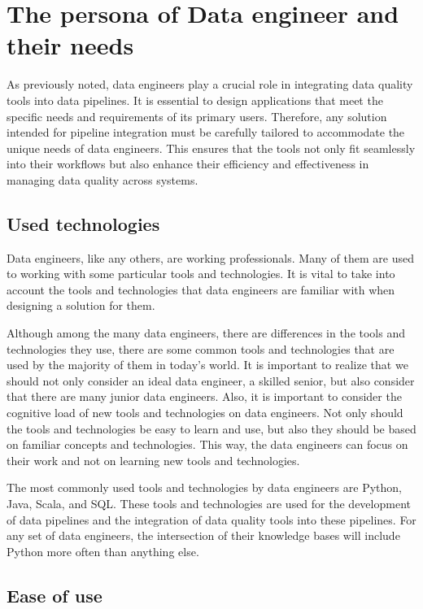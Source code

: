 \section{The persona of Data engineer and their needs}

As previously noted, data engineers play a crucial role in integrating data quality tools into data pipelines. It is essential to design applications that meet the specific needs and requirements of its primary users. Therefore, any solution intended for pipeline integration must be carefully tailored to accommodate the unique needs of data engineers. This ensures that the tools not only fit seamlessly into their workflows but also enhance their efficiency and effectiveness in managing data quality across systems.

\subsection{Used technologies}

Data engineers, like any others, are working professionals. Many of them are used to working with some particular tools and technologies. It is vital to take into account the tools and technologies that data engineers are familiar with when designing a solution for them.

Although among the many data engineers, there are differences in the tools and technologies they use, there are some common tools and technologies that are used by the majority of them in today's world. It is important to realize that we should not only consider an ideal data engineer, a skilled senior, but also consider that there are many junior data engineers. Also, it is important to consider the cognitive load of new tools and technologies on data engineers. Not only should the tools and technologies be easy to learn and use, but also they should be based on familiar concepts and technologies. This way, the data engineers can focus on their work and not on learning new tools and technologies. 

The most commonly used tools and technologies by data engineers are Python, Java, Scala, and SQL. These tools and technologies are used for the development of data pipelines and the integration of data quality tools into these pipelines. For any set of data engineers, the intersection of their knowledge bases will include Python more often than anything else.

\subsection{Ease of use}

